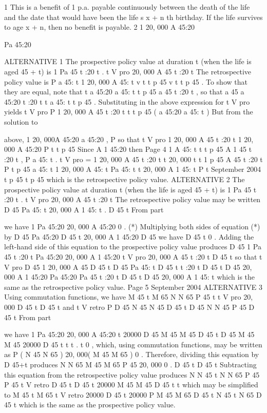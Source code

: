 \documentclass[a4paper,12pt]{article}
\begin{document}
1
This is a benefit of 1 p.a. payable continuously between the death of the life and the
date that would have been the life s x + n th birthday.
If the life survives to age x + n, then no benefit is payable.
2
1
20, 000 A 45:20
\item  Pa 45:20
\item  ALTERNATIVE 1
The prospective policy value at duration t (when the life is aged 45 + t) is
1
Pa 45 t :20 t .
t V pro 20, 000 A 45 t :20 t
The retrospective policy value is
P
a 45: t 1
20, 000 A 45:
t
v t t p 45 v t t p 45
.
To show that they are equal, note that
t
a 45:20 a 45: t
t p 45 a 45 t :20 t ,
so that
a 45
a 45:20
t :20 t
t
a 45: t
t p 45
.
Substituting in the above expression for t V pro yields
t V pro
P
1
20, 000 A 45
t :20 t
t
t
p 45
( a 45:20
a 45: t )
But from the solution to \item  above,
1
20, 000A 45:20
a 45:20
,
P
so that
t V pro
1
20, 000 A 45
t :20 t
1
20, 000 A 45:20
P
t
t
p 45
Since
A 1 45:20
then
Page 4
1
A 45:
t
t
t
p 45 A 1 45
t :20 t
,
P
a 45: t . %
t V pro
=
1
20, 000 A 45
t :20 t
t
20, 000
t
t
1
p 45 A 45
t :20 t
P
t p 45
a 45: t
1
20, 000 A 45:
t
Pa 45: t
t
20, 000 A 1 45: t
P
t
September 2004
t
p 45
t
p 45
which is the retrospective policy value.
ALTERNATIVE 2
The prospective policy value at duration t (when the life is aged 45 + t) is
1
Pa 45 t :20 t .
t V pro 20, 000 A 45 t :20 t
The retrospective policy value may be written
D 45
Pa 45: t 20, 000 A 1 45: t .
D 45 t
From part \item  we have
1
Pa 45:20 20, 000 A 45:20
0 . (*)
Multiplying both sides of equation (*) by
D 45
Pa 45:20
D 45 t
20, 000 A 1 45:20
D 45
we have
D 45 t
0 .
Adding the left-hand side of this equation to the prospective policy value
produces
D 45
1
Pa 45 t :20 t
Pa 45:20 20, 000 A 1 45:20
t V pro 20, 000 A 45 t :20 t
D 45 t
so that
t V pro
D 45
1
20, 000 A 45
D 45 t
D 45
Pa 45: t
D 45 t
t :20 t
D 45 t
D 45
20, 000 A 1 45:20
Pa 45:20
Pa 45
t :20 t
D 45 t
D 45
20, 000 A 1 45: t
which is the same as the retrospective policy value.
Page 5 %
September 2004
ALTERNATIVE 3
Using commutation functions, we have
M 45 t M 65
N
N 65
P 45 t
t V pro 20, 000
D 45 t
D 45 t
and
t V retro
P
D 45 N 45 N 45
D 45 t
D 45
N
N 45
P 45
D 45 t
From part \item  we have
1
Pa 45:20 20, 000 A 45:20
t
20000
D 45 M 45 M 45
D 45 t
D 45
M 45 M 45
20000
D 45 t
t
t
.
t
0 ,
which, using commutation functions, may be written as
P ( N 45 N 65 ) 20, 000( M 45 M 65 ) 0 .
Therefore, dividing this equation by D 45+t produces
N
N 65
M 45 M 65
P 45
20, 000
0 .
D 45 t
D 45 t
Subtracting this equation from the retrospective policy value
produces
N
N 45 t
N
N 65
P 45
P 45
t V retro
D 45 t
D 45 t
20000
M 45 M 45
D 45 t
t
which may be simplified to
M 45 t M 65
t V retro 20000
D 45 t
20000
P
M 45 M 65
D 45 t
N 45 t N 65
D 45 t
which is the same as the prospective policy value.
\end{document}
